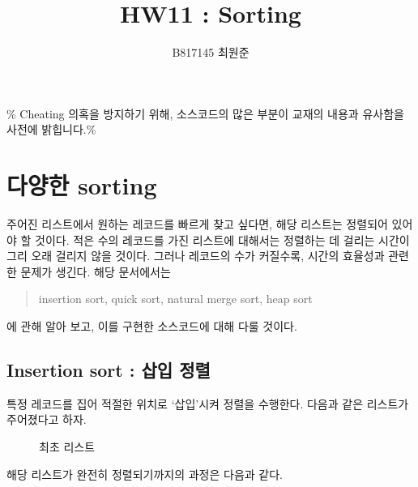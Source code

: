 \documentclass{article}
\begin{document}
\title{HW11 : Sorting}
\author{B817145 최원준}
\maketitle \textcolor{red!70}{\% Cheating 의혹을 방지하기 위해, 소스코드의 많은 부분이 교재의 내용과 유사함을 사전에 밝힙니다.\%}

\section{다양한 sorting}
주어진 리스트에서 원하는 레코드를 빠르게 찾고 싶다면, 해당 리스트는 정렬되어 있어야 할 것이다. 적은 수의 레코드를 가진 리스트에 대해서는 정렬하는 데 걸리는 시간이 그리 오래 걸리지 않을 것이다. 그러나 레코드의 수가 커질수록, 시간의 효율성과 관련한 문제가 생긴다. 해당 문서에서는 
\begin{quote}
    \centering insertion sort, quick sort, natural merge sort, heap sort
\end{quote}에 관해 알아 보고, 이를 구현한 소스코드에 대해 다룰 것이다.

\subsection{Insertion sort : 삽입 정렬}
특정 레코드를 집어 적절한 위치로 `삽입'시켜 정렬을 수행한다.
다음과 같은 리스트가 주어졌다고 하자.\\
\begin{figure}[H]\centering
{}
\caption{최초 리스트}
\end{figure}
해당 리스트가 완전히 정렬되기까지의 과정은 다음과 같다.\\


\begin{center}
\end{center}



\begin{center}
\end{center}
\end{document}

